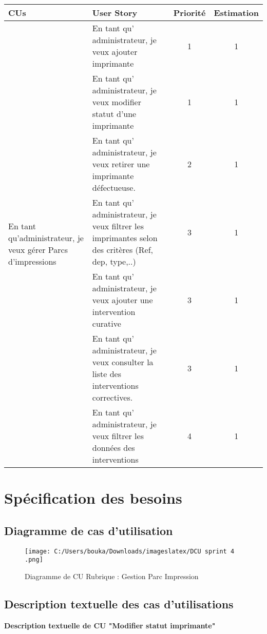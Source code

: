\documentclass[a4paper,11pt]{report}
\begin{document}
\begin{tabular}{|m{4cm}|m{5cm}|c|c|}
\hline
\textbf{	CUs} & \textbf{User Story} & \textbf{Priorité} & \textbf{Estimation} \\
\hline

\multirow{7}{4cm}{En tant qu’administrateur, je veux gérer Parcs d’impressions} 
& En tant qu' administrateur, je veux ajouter imprimante & 1 & 1 \\
\cline{2-4}
& En tant qu' administrateur, je veux modifier statut d’une imprimante & 1 & 1 \\
\cline{2-4}
& En tant qu' administrateur, je veux retirer une imprimante défectueuse. & 2 & 1 \\
\cline{2-4}
& En tant qu' administrateur, je veux filtrer les imprimantes selon des critères (Ref, dep, type,..) & 3 & 1 \\
\cline{2-4}
& En tant qu' administrateur, je veux ajouter une intervention curative & 3 & 1 \\
\cline{2-4}
& En tant qu' administrateur, je veux consulter la liste des interventions correctives. & 3 & 1 \\
\cline{2-4}
& En tant qu' administrateur, je veux filtrer les données des interventions & 4 & 1 \\
\hline
\end{tabular}

\section{Spécification des besoins}
\subsection{Diagramme de cas d’utilisation }

\begin{figure}[H]
  \centering
  \texttt{[image: C:/Users/bouka/Downloads/imageslatex/DCU sprint 4 .png]}
  \caption{Diagramme de CU Rubrique : Gestion Parc Impression}
  \label{fig:clone-result}
\end{figure}

\subsection{Description textuelle des cas d’utilisations }

\textbf{Description textuelle de CU "Modifier statut imprimante"}
\end{document}
